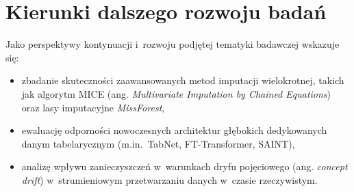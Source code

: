 \section{Kierunki dalszego rozwoju badań}
Jako perspektywy kontynuacji i~rozwoju podjętej tematyki badawczej wskazuje się:
\begin{itemize}
    \item zbadanie skuteczności zaawansowanych metod imputacji wielokrotnej, takich jak algorytm MICE (ang. \textit{Multivariate Imputation by Chained Equations}) oraz lasy imputacyjne \textit{MissForest},
    \item ewaluację odporności nowoczesnych architektur głębokich dedykowanych danym tabelarycznym (m.in.~TabNet, FT-Transformer, SAINT),
    \item analizę wpływu zanieczyszczeń w~warunkach dryfu pojęciowego (ang. \textit{concept drift}) w~strumieniowym przetwarzaniu danych w~czasie rzeczywistym.
\end{itemize}
